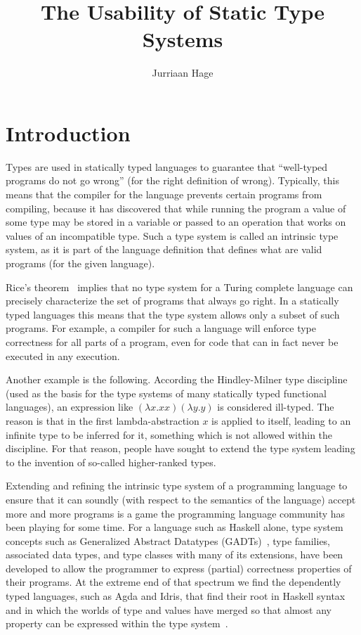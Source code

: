 \documentclass[sigplan,10pt,noacm]{acmart}
\begin{document}
\title{The Usability of Static Type Systems}
\author{Jurriaan Hage}

\maketitle


\section{Introduction}

Types are used in statically typed languages to guarantee that
``well-typed programs do not go wrong'' (for the right definition of
wrong). Typically, this means that the compiler for the language
prevents certain programs from compiling, because it has discovered
that while running the program a value of some type may be stored
in a variable or passed to an operation that
works on values of an incompatible type. Such a type system is called an 
intrinsic type system,
as it is part of the language definition that defines what are valid
programs (for the given language). 

Rice's theorem~\cite{} implies that no type system for a Turing complete
language can precisely characterize the set of programs that always go right.
In a statically typed languages this means that the type system allows
only a subset of such programs. For example, a compiler for such a language
will enforce type correctness for all parts of a program, even for code
that can in fact never be executed in any execution.

Another example is the following. 
According the Hindley-Milner type discipline~\cite{} (used as the basis
for the type systems of many statically typed functional languages), 
an expression like $(\lambda x . x x) (\lambda y. y)$ is considered
ill-typed. The reason is that in the first lambda-abstraction $x$ is applied
to itself, leading to an infinite type to be inferred for it, something which
is not allowed within the discipline. For that reason, people have sought
to extend the type system leading to the invention of so-called 
higher-ranked types.

Extending and refining the intrinsic type system of a programming language to 
ensure that it can soundly (with respect to the semantics of the language)
accept more and more programs is a game the programming language community
has been playing for some time. For a language such as Haskell alone, 
type system concepts such as Generalized Abstract Datatypes (GADTs)~\cite{},
type families,
associated data types, and type classes with many of its extensions, 
have been developed to allow the programmer to express (partial) correctness
properties of their programs. At the extreme end of that spectrum we find
the dependently typed languages, such as Agda and Idris, that find their 
root in Haskell syntax and in which the worlds of type and values have
merged so that almost any property can be expressed within the 
type system~\cite{wouter}.
\end{document}
